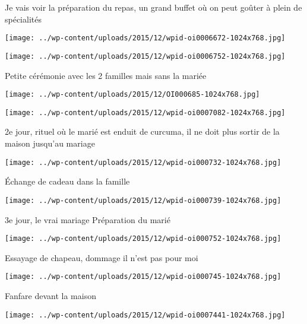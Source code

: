  Je vais voir la préparation du repas, un grand buffet où on peut goûter à plein de spécialités \newline
 \newline
\centerline{\texttt{[image: ../wp-content/uploads/2015/12/wpid-oi0006672-1024x768.jpg]} } 
 \newline
 \newline
\centerline{\texttt{[image: ../wp-content/uploads/2015/12/wpid-oi0006752-1024x768.jpg]} } 
 \newline
 Petite cérémonie avec les 2 familles mais sans la mariée \newline
 \newline
\centerline{\texttt{[image: ../wp-content/uploads/2015/12/OI000685-1024x768.jpg]} } 
 \newline
 \newline
\centerline{\texttt{[image: ../wp-content/uploads/2015/12/wpid-oi0007082-1024x768.jpg]} } 
 \newline
 2e jour, rituel où le marié est enduit de curcuma, il ne doit plus sortir de la maison jusqu'au mariage \newline
 \newline
\centerline{\texttt{[image: ../wp-content/uploads/2015/12/wpid-oi000732-1024x768.jpg]} } 
 \newline
 Échange de cadeau dans la famille \newline
 \newline
\centerline{\texttt{[image: ../wp-content/uploads/2015/12/wpid-oi000739-1024x768.jpg]} } 
 \newline
 3e jour, le vrai mariage \newline
 Préparation du marié \newline
 \newline
\centerline{\texttt{[image: ../wp-content/uploads/2015/12/wpid-oi000752-1024x768.jpg]} } 
 \newline
 Essayage de chapeau, dommage il n'est pas pour moi \newline
 \newline
\centerline{\texttt{[image: ../wp-content/uploads/2015/12/wpid-oi000745-1024x768.jpg]} } 
 \newline
 Fanfare devant la maison \newline
 \newline
\centerline{\texttt{[image: ../wp-content/uploads/2015/12/wpid-oi0007441-1024x768.jpg]} } 
 \newline
